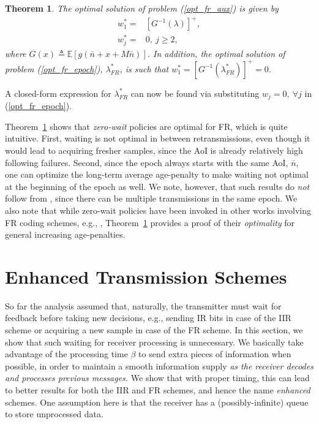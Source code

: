 \documentclass[12pt,journal,onecolumn]{IEEEtran}
\newtheorem{theorem}{Theorem}
\begin{document}
\begin{theorem} \label{thm_fr_main_result}
The optimal solution of problem (\ref{opt_fr_aux}) is given by
\begin{align}
w_1^*=&\left[G^{-1}(\lambda)\right]^+, \\
w_j^*=&0,~j\geq2,
\end{align}
where $G(x)\triangleq\mathbb{E}\left[g\left(\bar{n}+x+M\bar{n}\right)\right]$. In addition, the optimal solution of problem (\ref{opt_fr_epoch}), $\lambda^*_{FR}$, is such that $w_1^*=\left[G^{-1}\left(\lambda^*_{FR}\right)\right]^+=0$.
\end{theorem}

A closed-form expression for $\lambda^*_{FR}$ can now be found via substituting $w_j=0,~\forall j$ in (\ref{opt_fr_epoch}).

Theorem~\ref{thm_fr_main_result} shows that {\it zero-wait} policies are optimal for FR, which is quite intuitive. First, waiting is not optimal in between retransmissions, even though it would lead to acquiring fresher samples, since the AoI is already relatively high following failures. Second, since the epoch always starts with the same AoI, $\bar{n}$, one can optimize the long-term average age-penalty to make waiting not optimal at the beginning of the epoch as well. We note, however, that such results do {\it not} follow from \cite[Theorem~5]{sun-age-mdp}, since there can be multiple transmissions in the same epoch. We also note that while zero-wait policies have been invoked in other works involving FR coding schemes, e.g., \cite{yates-age-erase-code, najm-age-erasure-coding}, Theorem~\ref{thm_fr_main_result} provides a proof of their {\it optimality} for general increasing age-penalties.



\section{Enhanced Transmission Schemes}

So far the analysis assumed that, naturally, the transmitter must wait for feedback before taking new decisions, e.g., sending IR bits in case of the IIR scheme or acquiring a new sample in case of the FR scheme. In this section, we show that such waiting for receiver processing is unnecessary. We basically take advantage of the processing time $\beta$ to send extra pieces of information when possible, in order to maintain a smooth information supply {\it as the receiver decodes and processes previous messages.} We show that with proper timing, this can lead to better results for both the IIR and FR schemes, and hence the name {\it enhanced} schemes. One assumption here is that the receiver has a (possibly-infinite) queue to store unprocessed data.
\end{document}
